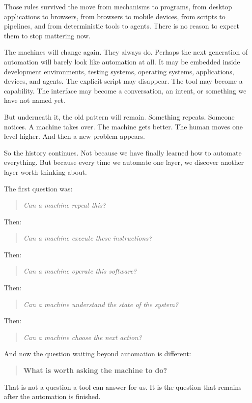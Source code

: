 \documentclass[11pt,twoside]{book}
\begin{document}
Those rules survived the move from mechanisms to programs, from desktop applications to browsers, from browsers to mobile devices, from scripts to pipelines, and from deterministic tools to agents.
There is no reason to expect them to stop mattering now.

The machines will change again.
They always do.
Perhaps the next generation of automation will barely look like automation at all. It may be embedded inside development environments, testing systems, operating systems, applications, devices, and agents. The explicit script may disappear. The tool may become a capability. The interface may become a conversation, an intent, or something we have not named yet.

But underneath it, the old pattern will remain.
Something repeats.
Someone notices.
A machine takes over.
The machine gets better.
The human moves one level higher.
And then a new problem appears.

So the history continues.
Not because we have finally learned how to automate everything.
But because every time we automate one layer, we discover another layer worth thinking about.

The first question was:
\begin{quote}
\emph{Can a machine repeat this?}
\end{quote}
Then:
\begin{quote}
\emph{Can a machine execute these instructions?}
\end{quote}
Then:
\begin{quote}
\emph{Can a machine operate this software?}
\end{quote}
Then:
\begin{quote}
\emph{Can a machine understand the state of the system?}
\end{quote}
Then:
\begin{quote}
\emph{Can a machine choose the next action?}
\end{quote}
And now the question waiting beyond automation is different:
\begin{quote}
\textbf{What is worth asking the machine to do?}
\end{quote}

That is not a question a tool can answer for us.
It is the question that remains after the automation is finished.
\end{document}
